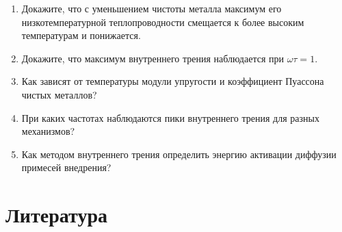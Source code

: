 {\begin{enumerate}[label=\arabic*.]
и когда они существенны?
\item Докажите, что с уменьшением чистоты металла максимум его
низкотемпературной теплопроводности смещается к более высоким
температурам и понижается.
\item Докажите, что максимум внутреннего трения наблюдается при
$\omega\tau=1$.
\item Как зависят от температуры модули упругости и коэффициент Пуассона
чистых металлов?
\item При каких частотах наблюдаются пики внутреннего трения для разных
механизмов?
\item Как методом внутреннего трения определить энергию активации
диффузии примесей внедрения?
\end{enumerate}
}

\section*{Литература}

